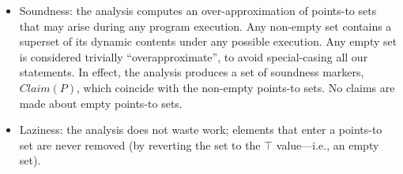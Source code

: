 \begin{itemize}
\item Soundness: the analysis computes an over-approximation of points-to sets that may arise during any program execution. Any non-empty set contains a superset of its dynamic contents under any possible execution. Any empty set is considered trivially ``overapproximate'', to avoid special-casing all our statements. In effect, the analysis produces a set of soundness markers, $Claim(P)$, which coincide with the non-empty points-to sets. No claims are made about empty points-to sets.

\item Laziness: the analysis does not waste work; elements that enter a points-to set are never removed (by reverting the set to the $\top$ value---i.e., an empty set).
\end{itemize}


